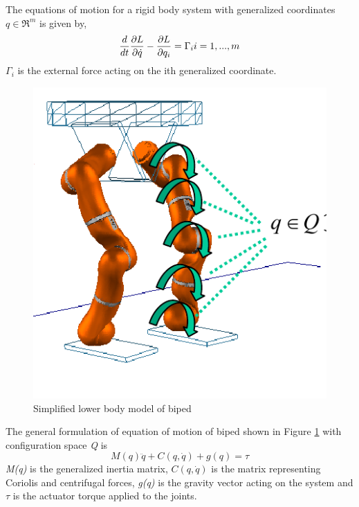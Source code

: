 The equations of motion for a rigid body system with generalized coordinates $q \in \Re^m $ is given by,
\begin{equation}
\frac{d}{dt} \frac{\partial {L}}{\partial {\dot{q}}}-\frac{\partial {L}}{\partial {q_i}} = \Gamma_i   i = 1,...,m
\end{equation}
$\Gamma_i$ is the external force acting on the ith generalized coordinate.
\begin{figure}
\begin{center}
\includegraphics[scale=0.75]{Bilder/model_biped.png}
\caption{Simplified lower body model of biped}
\label{fig:biped_simplelow}
\end{center}
\end{figure}
The general formulation of equation of motion of biped shown in Figure \ref{fig:biped_simplelow} with configuration space \emph{Q} is
\begin{equation}
M(q)\ddot{q}+C(q,\dot{q})+g(q) = \tau
\end{equation}
\emph{M(q)} is the generalized inertia matrix, $C(q,\dot{q})$ is the matrix representing Coriolis and centrifugal forces, \emph{g(q)} is the gravity vector acting on the system and $\tau$ is the actuator torque applied to the joints.

